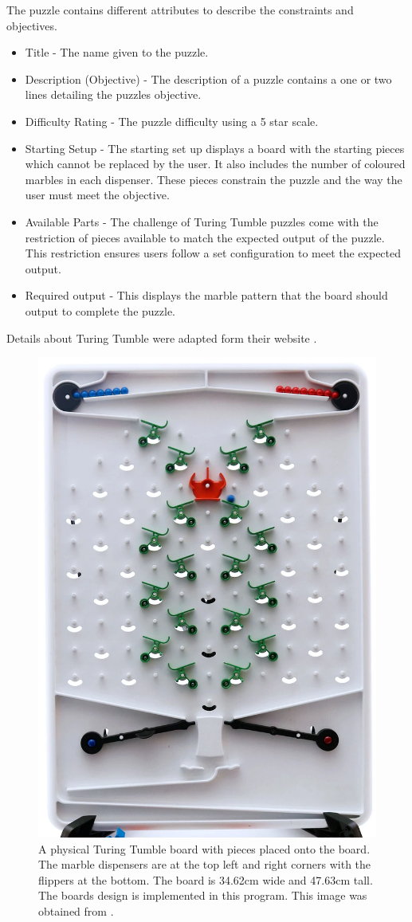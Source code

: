 \documentclass{l4proj}
\begin{document}
The puzzle contains different attributes to describe the constraints and objectives.
\begin{itemize}
    \item Title - The name given to the puzzle.
    \item Description (Objective) - The description of a puzzle contains a one or two lines detailing the puzzles objective.
    \item Difficulty Rating - The puzzle difficulty using a 5 star scale.
    \item Starting Setup - The starting set up displays a board with the starting pieces which cannot be replaced by the user. It also includes the number of coloured marbles in each dispenser. These pieces constrain the puzzle and the way the user must meet the objective.
    \item Available Parts - The challenge of Turing Tumble puzzles come with the restriction of pieces available to match the expected output of the puzzle. This restriction ensures users follow a set configuration to meet the expected output.
    \item Required output - This displays the marble pattern that the board should output to complete the puzzle.
\end{itemize}

Details about Turing Tumble were adapted form their website \citep{turing_tumble_site}.

\begin{figure}
    \centering
    \includegraphics[width=0.6\linewidth]{images/turingTumbleBoard.png}
    \caption{A physical Turing Tumble board with pieces placed onto the board. The marble dispensers are at the top left and right corners with the flippers at the bottom. The board is 34.62cm wide and 47.63cm tall. The boards design is implemented in this program. This image was obtained from \cite{turing_tumble_picture}.}
    \label{fig:ttboard}
\end{figure}
\end{document}
